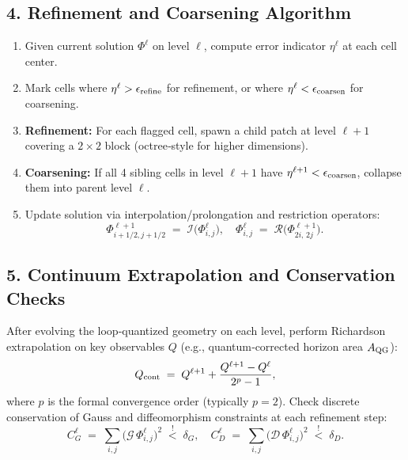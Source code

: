 \documentclass[12pt]{article}
\begin{document}
\subsection*{4. Refinement and Coarsening Algorithm}
\begin{enumerate}
  \item Given current solution $\Phi^\ell$ on level $\ell$, compute error indicator $\eta^\ell$ at each cell center.
  \item Mark cells where $\eta^\ell > \epsilon_{\rm refine}$ for refinement, or where $\eta^\ell < \epsilon_{\rm coarsen}$ for coarsening.
  \item \textbf{Refinement:} For each flagged cell, spawn a child patch at level $\ell+1$ covering a $2\times 2$ block (octree‐style for higher dimensions).  
  \item \textbf{Coarsening:} If all 4 sibling cells in level $\ell+1$ have $\eta^{\ell+1} < \epsilon_{\rm coarsen}$, collapse them into parent level $\ell$.
  \item Update solution via interpolation/prolongation and restriction operators:
    \[
      \Phi^{\ell+1}_{i+1/2,j+1/2} \;=\; \mathcal{I} \bigl(\Phi^\ell_{i,j}\bigr), 
      \quad 
      \Phi^\ell_{i,j} \;=\; \mathcal{R}\bigl(\Phi^{\ell+1}_{2i,\,2j}\bigr).
    \]
\end{enumerate}

\subsection*{5. Continuum Extrapolation and Conservation Checks}
After evolving the loop‐quantized geometry on each level, perform Richardson extrapolation on key observables $Q$ (e.g., quantum‐corrected horizon area $A_{\rm QG}$):
\[
  Q_{\rm cont} \;=\; Q^{\ell+1} + \frac{Q^{\ell+1} - Q^\ell}{2^p - 1}, 
\]
where $p$ is the formal convergence order (typically $p=2$).  Check discrete conservation of Gauss and diffeomorphism constraints at each refinement step:
\[
  C_{G}^\ell \;=\; \sum_{i,j} \bigl(\mathcal{G} \, \Phi^\ell_{i,j}\bigr)^2 \;\stackrel{!}{<}\; \delta_G, 
  \quad 
  C_{D}^\ell \;=\; \sum_{i,j} \bigl(\mathcal{D} \, \Phi^\ell_{i,j}\bigr)^2 \;\stackrel{!}{<}\; \delta_D.
\]
\end{document}
